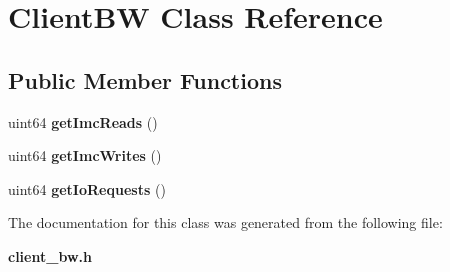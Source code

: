\section{Client\+B\+W Class Reference}
\label{classClientBW}
\subsection*{Public Member Functions}
\begin{DoxyCompactItemize}
\item 
uint64 {\bfseries get\+Imc\+Reads} ()\label{classClientBW_adfd4220c06e62c3c3afe94d8388bcfe7}

\item 
uint64 {\bfseries get\+Imc\+Writes} ()\label{classClientBW_ad6ff206335be757c9de8fb732e66d2da}

\item 
uint64 {\bfseries get\+Io\+Requests} ()\label{classClientBW_acf0f1555e987641be5196312b89eb12b}

\end{DoxyCompactItemize}


The documentation for this class was generated from the following file\+:\begin{DoxyCompactItemize}
\item 
{\bf client\+\_\+bw.\+h}\end{DoxyCompactItemize}
